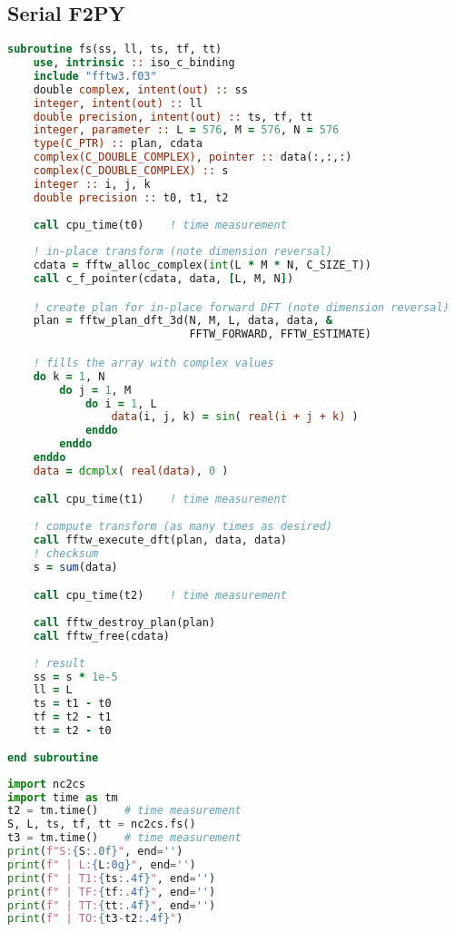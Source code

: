 \subsection{Serial F2PY}
\begin{lstlisting}[language=Fortran, caption={Serial F2PY implementation of the FFT test case - F90 module code.}]
subroutine fs(ss, ll, ts, tf, tt)
    use, intrinsic :: iso_c_binding
    include "fftw3.f03"
    double complex, intent(out) :: ss
    integer, intent(out) :: ll
    double precision, intent(out) :: ts, tf, tt
    integer, parameter :: L = 576, M = 576, N = 576
    type(C_PTR) :: plan, cdata
    complex(C_DOUBLE_COMPLEX), pointer :: data(:,:,:)
    complex(C_DOUBLE_COMPLEX) :: s
    integer :: i, j, k
    double precision :: t0, t1, t2
    
    call cpu_time(t0)    ! time measurement
           
    ! in-place transform (note dimension reversal)
    cdata = fftw_alloc_complex(int(L * M * N, C_SIZE_T))
    call c_f_pointer(cdata, data, [L, M, N])

    ! create plan for in-place forward DFT (note dimension reversal)   
    plan = fftw_plan_dft_3d(N, M, L, data, data, &
                            FFTW_FORWARD, FFTW_ESTIMATE)

    ! fills the array with complex values
    do k = 1, N
        do j = 1, M
            do i = 1, L
                data(i, j, k) = sin( real(i + j + k) )
            enddo
        enddo
    enddo
    data = dcmplx( real(data), 0 )

    call cpu_time(t1)    ! time measurement
    
    ! compute transform (as many times as desired)    
    call fftw_execute_dft(plan, data, data)
    ! checksum
    s = sum(data)

    call cpu_time(t2)    ! time measurement
               
    call fftw_destroy_plan(plan)
    call fftw_free(cdata)
     
    ! result
    ss = s * 1e-5
    ll = L
    ts = t1 - t0
    tf = t2 - t1
    tt = t2 - t0
    
end subroutine
\end{lstlisting}




\begin{lstlisting}[language=Python, caption={Serial F2PY implementation of the FFT test case - Python main code.}]
import nc2cs
import time as tm
t2 = tm.time()    # time measurement
S, L, ts, tf, tt = nc2cs.fs()
t3 = tm.time()    # time measurement
print(f"S:{S:.0f}", end='')
print(f" | L:{L:0g}", end='')
print(f" | T1:{ts:.4f}", end='')
print(f" | TF:{tf:.4f}", end='')
print(f" | TT:{tt:.4f}", end='')
print(f" | TO:{t3-t2:.4f}")
\end{lstlisting}




